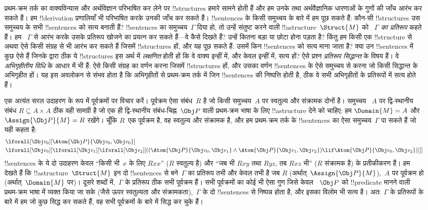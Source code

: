 \documentclass[../../../include/open-logic-section]{subfiles}
\begin{document}


प्रथम-क्रम तर्क का वाक्यविन्यास और अर्थविज्ञान परिभाषित कर लेने पर
!!{structure}s हमारे सामने होती हैं और हम उनके तथा अर्थवैज्ञानिक धारणाओं के गुणों की जाँच आरंभ कर सकते हैं।
हम !!{derivation} प्रणालियाँ भी परिभाषित करके उनकी जाँच कर सकते हैं।
!!{sentence}s के किसी समुच्चय के बारे में हम पूछ सकते हैं: कौन-सी
!!{structure}s उस समुच्चय के सभी !!{sentence}s को सत्य बनाती हैं?
!!{sentence}s का समुच्चय~$\Gamma$ दिया हो, तो उन्हें संतुष्ट करने वाली
!!a{structure}~$\Struct{M}$ को \emph{~$\Gamma$ का प्रतिरूप} कहते हैं। हम
~$\Gamma$ से आरंभ करके उसके प्रतिरूप खोजने का प्रयत्न कर सकते हैं---वे कैसे
दिखते हैं? उन्हें कितना बड़ा या छोटा होना पड़ता है? किंतु हम किसी एक
!!{structure} से अथवा ऐसे किसी संग्रह से भी आरंभ कर सकते हैं जिसमें
!!{structure}s हों, और यह पूछ सकते हैं: उसमें किन !!{sentence}s को सत्य माना
जाता है? क्या उन !!{sentence}s में कुछ ऐसे हैं जिनके द्वारा ठीक ये
!!{structure}s इस अर्थ में \emph{लक्षणित} होती हों कि वे वाक्य इन्हीं में,
और केवल इन्हीं में, सत्य हों? ऐसे प्रश्न \emph{प्रतिरूप सिद्धान्त} के विषय
हैं। वे \emph{अभिगृहीतीय विधि} के आधार में भी हैं: ऐसे किसी संग्रह का वर्णन
करना जिसमें !!{structure}s हों, और उसका वर्णन !!{sentence}s के ऐसे समुच्चय
से करना जो किसी सिद्धान्त के अभिगृहीत हों। यह इस अवलोकन से संभव होता है कि
अभिगृहीतों से प्रथम-क्रम तर्क में जिन !!{sentence}s की निष्पत्ति होती है,
ठीक वे सभी अभिगृहीतों के प्रतिरूपों में सत्य होते हैं।

एक अत्यंत सरल उदाहरण के रूप में पूर्वक्रमों पर विचार करें। पूर्वक्रम ऐसा
संबंध~$R$ है जो किसी समुच्चय~$A$ पर स्वतुल्य और संक्रामक दोनों है। समुच्चय
~$A$ पर द्वि-स्थानीय संबंध $R \subseteq A \times A$ ठीक वही सामग्री है जो
एक ही द्वि-स्थानीय संबंध-चिह्न~$\Obj P$ वाली प्रथम-क्रम भाषा के लिए
!!a{structure} देने को चाहिए: हम $\Domain{M} = A$ और
$\Assign{\Obj P}{M} = R$ रखेंगे। चूँकि $R$~एक पूर्वक्रम है, वह स्वतुल्य और
संक्रामक है, और हम प्रथम-क्रम तर्क के !!{sentence}s का ऐसा समुच्चय~$\Gamma$
पा सकते हैं जो यही कहता है:
\begin{align*}
  & \lforall[\Obj v_0][\Atom{\Obj P}{\Obj v_0,\Obj v_0}]\\
  & \lforall[\Obj v_0][\lforall[\Obj v_1][\lforall[\Obj v_2][((\Atom{\Obj P}{\Obj v_0,\Obj v_1} \land \Atom{\Obj P}{\Obj v_1,\Obj v_2}) \lif \Atom{\Obj P}{\Obj v_0,\Obj v_2})]]]
\end{align*}
!!{sentence}s के ये दो उदाहरण केवल ``किसी भी~$x$ के लिए $Rxx$'' ($R$ स्वतुल्य है) और
``जब भी $Rxy$ तथा $Ryz$, तब $Rxz$ भी'' ($R$ संक्रामक है) के प्रतीकीकरण हैं।
हम देखते हैं कि !!a{structure}~$\Struct{M}$ इन दो !!{sentence}s से बने~$\Gamma$ का
प्रतिरूप तभी और केवल तभी है जब $R$ (अर्थात्~$\Assign{\Obj P}{M}$),~$A$ पर
पूर्वक्रम हो (अर्थात्~$\Domain{M}$ पर)। दूसरे शब्दों में,~$\Gamma$ के
प्रतिरूप ठीक सभी पूर्वक्रम हैं। सभी पूर्वक्रमों का कोई भी ऐसा गुण जिसे केवल
~$\Obj P$ को !!{predicate} मानने वाली प्रथम-क्रम भाषा में व्यक्त किया जा सके
(जैसे ऊपर स्वतुल्यता और संक्रामकता),~$\Gamma$ के दो !!{sentence}s से निष्पन्न
होता है, और इसका विलोम भी सत्य है। अतः~$\Gamma$ के प्रतिरूपों के बारे में हम
जो कुछ सिद्ध कर सकते हैं, वह सभी पूर्वक्रमों के बारे में सिद्ध कर चुके हैं।
\end{document}

